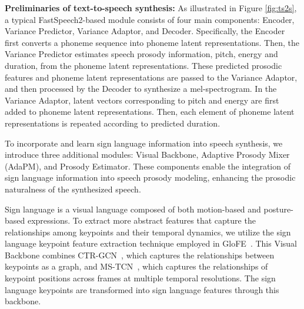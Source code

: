 \noindent
\textbf{Preliminaries of text-to-speech synthesis:}
As illustrated in Figure \ref{fig:ts2s}, a typical FastSpeech2-based module consists of four main components: Encoder, Variance Predictor, Variance Adaptor, and Decoder.
Specifically, the Encoder first converts a phoneme sequence into phoneme latent representations. Then, the Variance Predictor estimates speech prosody information, pitch, energy and duration, from the phoneme latent representations. These predicted prosodic features and phoneme latent representations are passed to the Variance Adaptor, and then processed by the Decoder to synthesize a mel-spectrogram.
In the Variance Adaptor, latent vectors corresponding to pitch and energy are first added to phoneme latent representations. Then, each element of phoneme latent representations is repeated according to predicted duration.

To incorporate and learn sign language information into speech synthesis, we introduce three additional modules: Visual Backbone, Adaptive Prosody Mixer (AdaPM), and Prosody Estimator.
These components enable the integration of sign language information into speech prosody modeling, enhancing the prosodic naturalness of the synthesized speech.

Sign language is a visual language composed of both motion-based and posture-based expressions.
To extract more abstract features that capture the relationships among keypoints and their temporal dynamics, we utilize the sign language keypoint feature extraction technique employed in GloFE~\cite{lin-etal-2023-gloss}.
This Visual Backbone combines CTR-GCN~\cite{Chen_2021_ICCV}, which captures the relationships between keypoints as a graph, and MS-TCN~\cite{Liu_2020_CVPR}, which captures the relationships of keypoint positions across frames at multiple temporal resolutions. The sign language keypoints are transformed into sign language features through this backbone.

